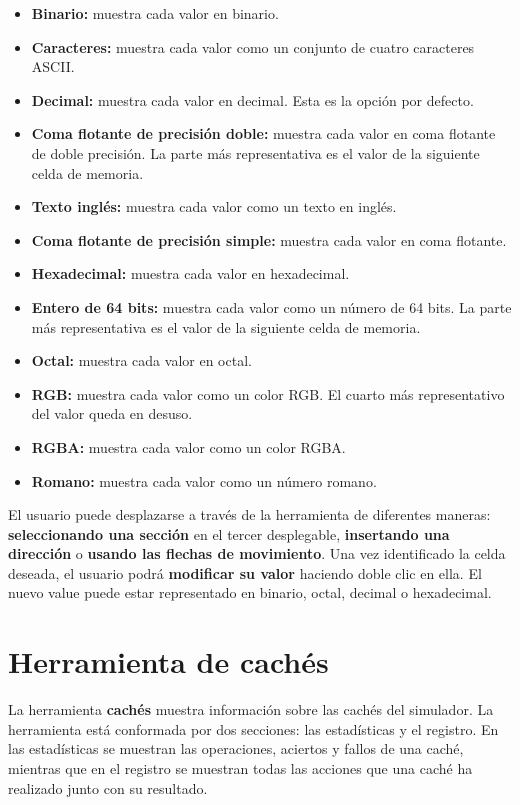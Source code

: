 \begin{itemize}
    \item \textbf{Binario:} muestra cada valor en binario.
    \item \textbf{Caracteres:} muestra cada valor como un conjunto de
    cuatro caracteres ASCII\@.
    \item \textbf{Decimal:} muestra cada valor en decimal.
    Esta es la opción por defecto.
    \item \textbf{Coma flotante de precisión doble:}  muestra cada valor
    en coma flotante de doble precisión.
    La parte más representativa es el valor de la siguiente celda de memoria.
    \item \textbf{Texto inglés:} muestra cada valor como un texto en inglés.
    \item \textbf{Coma flotante de precisión simple:} muestra cada
    valor en coma flotante.
    \item \textbf{Hexadecimal:} muestra cada valor en hexadecimal.
    \item \textbf{Entero de 64 bits:} muestra cada valor como un número de 64 bits.
    La parte más representativa es el valor de la siguiente celda de memoria.
    \item \textbf{Octal:} muestra cada valor en octal.
    \item \textbf{RGB:} muestra cada valor como un color RGB\@.
    El cuarto más representativo del valor queda en desuso.
    \item \textbf{RGBA:} muestra cada valor como un color RGBA\@.
    \item \textbf{Romano:} muestra cada valor como un número romano.
\end{itemize}

\noindent El usuario puede desplazarse a través de la herramienta
de diferentes maneras: \textbf{seleccionando una sección}
en el tercer desplegable, \textbf{insertando una dirección}
o \textbf{usando las flechas de movimiento}.
Una vez identificado la celda deseada, el usuario podrá
\textbf{modificar su valor} haciendo doble clic en ella.
El nuevo value puede estar representado en binario, octal,
decimal o hexadecimal.


\section{Herramienta de cachés}\label{sec:herramienta-de-caches}

La herramienta \textbf{cachés} muestra información
sobre las cachés del simulador.
La herramienta está conformada por dos secciones:
las estadísticas y el registro.
En las estadísticas se muestran las operaciones,
aciertos y fallos de una caché, mientras que en el
registro se muestran todas las acciones que una
caché ha realizado junto con su resultado.

